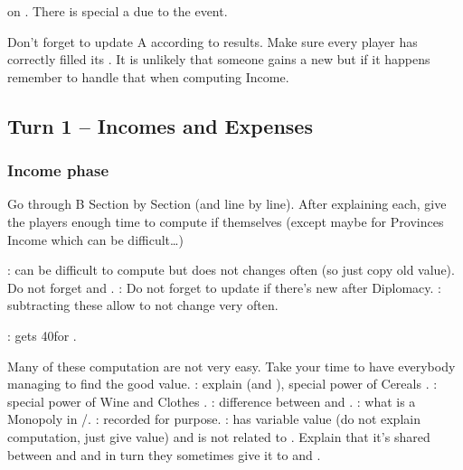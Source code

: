 \aparag \FRA on \paysToscane.
\bparag There is special a  due to the event.

\aparag Don't forget to update \EcoRS A according to results. Make sure every
player has correctly filled its .
\bparag It is unlikely that someone gains a new \VASSAL but if it happens
remember to handle that when computing Income.

\subsection{Turn 1 -- Incomes and Expenses}
\subsubsection{Income phase}
\aparag Go through \EcoRS B Section by Section (and line by line). After
explaining each, give the players enough time to compute if themselves (except
maybe for Provinces Income which can be difficult\ldots)

\bparag {}: can be difficult to compute but
does not changes often (so just copy old value). Do not forget  and .
\bparag {}: Do not forget to update if
there's new \VASSAL after Diplomacy.
\bparag {}: subtracting these
allow to not change  very often.

\bparag {}: \POR gets 40\ducats for
.

 Many of these computation are not very easy. Take your
time to have everybody managing to find the good value.
\bparag {}: explain \DTI (and \FTI),
special power of Cereals \MNU.
\bparag {}: special power of Wine and
Clothes \MNU.
\bparag {}: difference between \STZ and
\CTZ.
\bparag {}: what is a Monopoly in
\STZ/\CTZ.
\bparag {}: recorded for \VPs
purpose.
\bparag {}:  has variable
value (do not explain computation, just give value) and is not related to
\TradeFLEET. Explain that it's shared between \paysEgypte and \paysDamas and
in turn they sometimes give it to \VEN and \TUR.

